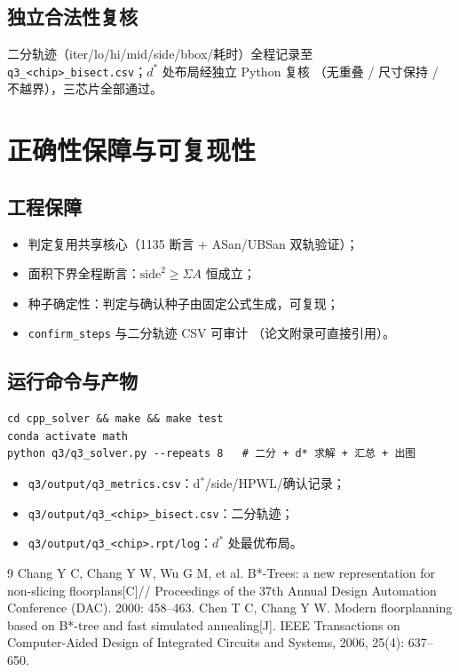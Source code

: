 \documentclass[12pt,a4paper]{article}
\begin{document}
\subsection{独立合法性复核}

二分轨迹（iter/lo/hi/mid/side/bbox/耗时）全程记录至
\texttt{q3\_<chip>\_bisect.csv}；$d^*$ 处布局经独立 Python 复核
（无重叠 / 尺寸保持 / 不越界），三芯片全部通过。

\section{正确性保障与可复现性}

\subsection{工程保障}

\begin{itemize}
    \item 判定复用共享核心（1135 断言 + ASan/UBSan 双轨验证）；
    \item 面积下界全程断言：$\text{side}^2 \ge \Sigma A$ 恒成立；
    \item 种子确定性：判定与确认种子由固定公式生成，可复现；
    \item \texttt{confirm\_steps} 与二分轨迹 CSV 可审计
    （论文附录可直接引用）。
\end{itemize}

\subsection{运行命令与产物}

{\small
\begin{verbatim}
cd cpp_solver && make && make test
conda activate math
python q3/q3_solver.py --repeats 8   # 二分 + d* 求解 + 汇总 + 出图
\end{verbatim}
}

\begin{itemize}
    \item \texttt{q3/output/q3\_metrics.csv}：d$^*$/side/HPWL/确认记录；
    \item \texttt{q3/output/q3\_<chip>\_bisect.csv}：二分轨迹；
    \item \texttt{q3/output/q3\_<chip>.rpt/log}：$d^*$ 处最优布局。
\end{itemize}

\begin{thebibliography}{9}
 Chang Y C, Chang Y W, Wu G M, et al. B*-Trees: a new
  representation for non-slicing floorplans[C]// Proceedings of the 37th
  Annual Design Automation Conference (DAC). 2000: 458--463.
 Chen T C, Chang Y W. Modern floorplanning based on B*-tree
  and fast simulated annealing[J]. IEEE Transactions on Computer-Aided
  Design of Integrated Circuits and Systems, 2006, 25(4): 637--650.
\end{thebibliography}
\end{document}
